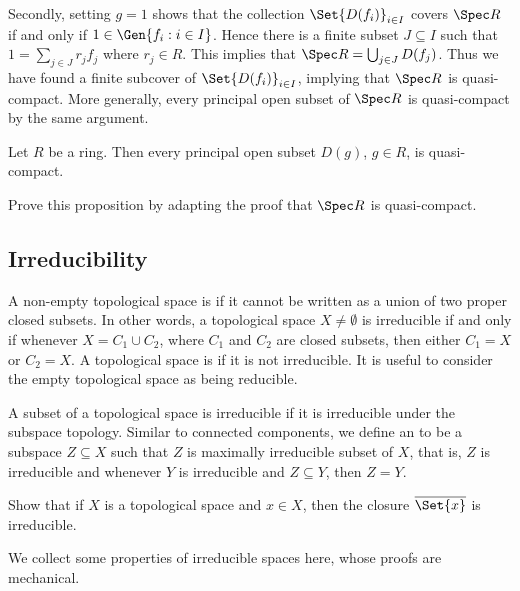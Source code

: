 Secondly, setting $g = 1$ shows that the collection $\Set{D(f_i)}_{i \in I}$ covers $\Spec R$ if and only if $1 \in \Gen{f_i : i \in I}$. Hence there is a finite subset $J \subseteq I$ such that $1 = \sum_{j \in J} r_j f_j$ where $r_j \in R$. This implies that $\Spec R = \bigcup_{j \in J} D(f_j)$. Thus we have found a finite subcover of $\Set{D(f_i)}_{i \in I}$, implying that $\Spec R$ is quasi-compact. More generally, every principal open subset of $\Spec R$ is quasi-compact by the same argument.

\begin{proposition}\label{chap2:principal-open-is-quasi-compact}
	Let $R$ be a ring. Then every principal open subset $D(g)$, $g \in R$, is quasi-compact. 
\end{proposition}
\begin{exercise}
	Prove this proposition by adapting the proof that $\Spec R$ is quasi-compact. 
\end{exercise}

\subsection*{Irreducibility}

A non-empty topological space is  if it cannot be written as a union of two proper closed subsets. In other words, a topological space $X \neq \emptyset$ is irreducible if and only if whenever $X = C_1 \cup C_2$, where $C_1$ and $C_2$ are closed subsets, then either $C_1 = X$ or $C_2 = X$. A topological space is  if it is not irreducible. It is useful to consider the empty topological space as being reducible.

A subset of a topological space is irreducible if it is irreducible under the subspace topology. Similar to connected components, we define an  to be a subspace $Z \subseteq X$ such that $Z$ is maximally irreducible subset of $X$, that is, $Z$ is irreducible and whenever $Y$ is irreducible and $Z \subseteq Y$, then $Z = Y$.

\begin{exercise}
	Show that if $X$ is a topological space and $x \in X$, then the closure $\overline{\Set{x}}$ is irreducible.
\end{exercise}

We collect some properties of irreducible spaces here, whose proofs are mechanical.

